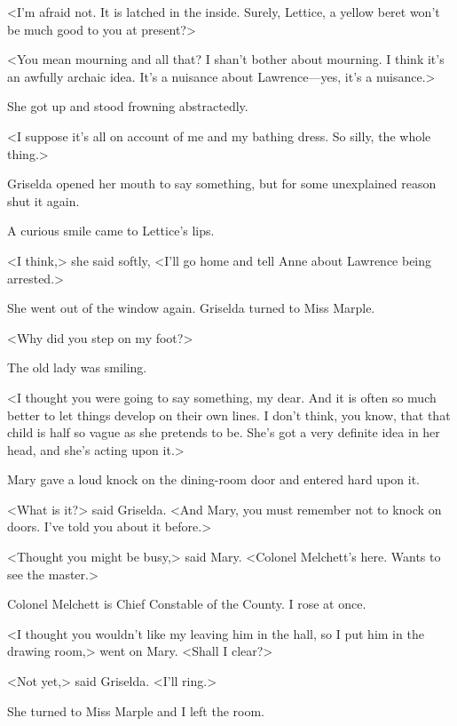 <I'm afraid not. It is latched in the inside. Surely, Lettice, a yellow beret won't be much good to you at present?>

<You mean mourning and all that? I shan't bother about mourning. I think it's an awfully archaic idea. It's a nuisance about Lawrence—yes, it's a nuisance.>

She got up and stood frowning abstractedly.

<I suppose it's all on account of me and my bathing dress. So silly, the whole thing.>

Griselda opened her mouth to say something, but for some unexplained reason shut it again.

A curious smile came to Lettice's lips.

<I think,> she said softly, <I'll go home and tell Anne about Lawrence being arrested.>

She went out of the window again. Griselda turned to Miss Marple.

<Why did you step on my foot?>

The old lady was smiling.

<I thought you were going to say something, my dear. And it is often so much better to let things develop on their own lines. I don't think, you know, that that child is half so vague as she pretends to be. She's got a very definite idea in her head, and she's acting upon it.>

Mary gave a loud knock on the dining-room door and entered hard upon it.

<What is it?> said Griselda. <And Mary, you must remember not to knock on doors. I've told you about it before.>

<Thought you might be busy,> said Mary. <Colonel Melchett's here. Wants to see the master.>

Colonel Melchett is Chief Constable of the County. I rose at once.

<I thought you wouldn't like my leaving him in the hall, so I put him in the drawing room,> went on Mary. <Shall I clear?>

<Not yet,> said Griselda. <I'll ring.>

She turned to Miss Marple and I left the room.